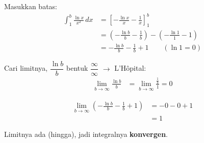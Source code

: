 \documentclass{article}
\begin{document}
Masukkan batas:
\begin{align*}
  \int_1^{b} \frac{\ln x}{x^2}\, dx
    &= \left[-\frac{\ln x}{x} - \frac{1}{x}\right]_1^b \\[6pt]
    &= \left(-\frac{\ln b}{b} - \frac{1}{b}\right) - \left(-\frac{\ln 1}{1} - 1\right) \\[6pt]
    &= -\frac{\ln b}{b} - \frac{1}{b} + 1 \qquad (\ln 1 = 0)
\end{align*}

Cari limitnya, $\dfrac{\ln b}{b}$ bentuk $\dfrac{\infty}{\infty}$ $\rightarrow$ L'H\^opital:
\begin{align*}
  \lim_{b \to \infty} \frac{\ln b}{b} &= \lim_{b \to \infty} \frac{\frac{1}{b}}{1} = 0
\end{align*}

\begin{align*}
  \lim_{b \to \infty} \left(-\frac{\ln b}{b} - \frac{1}{b} + 1\right) &= -0 - 0 + 1 \\
  &= 1
\end{align*}

Limitnya ada (hingga), jadi integralnya \textbf{konvergen}.

\end{document}
